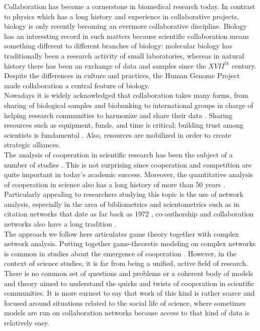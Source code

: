 \documentclass{bmcart}
\begin{document}
Collaboration has become a cornerstone in biomedical research today.
In contrast to physics which has a long history and experience in
collaborative projects, biology is only recently becoming an evermore
collaborative discipline\cite{VermeulenPenders:2013}. Biology has an
interesting record in such matters because scientific collaboration
means something different to different branches of biology: molecular
biology has traditionally been a research activity of small
laboratories\cite{KnorrCetina:1999,Strasser:2006}, whereas in natural
history there has been an exchange of data and samples since the $XVII^{th}$
century\cite{MullerWille-etal:2012,Strasser:2012}. Despite the differences in
culture and practices, the Human Genome Project made collaboration a
central feature of biology.\\


Nowadays it is widely acknowledged that collaboration takes many forms, from
sharing of biological samples and biobanking to international groups in charge
of helping research communities to harmonize and share their data {\color{red}
\cite{VermeulenPenders:2013,Barrett-etal:2013,Federer-etal:2015,Karimi-Busheri:2015,Vallance-etal:2016,Warner-etal:2017}. Sharing
resources such as equipment, funds, and time is critical; building trust among
scientists is fundamental \cite{Bennett-etal:2010,Leite:2017}. Also, resources are mobilized
in order to create strategic alliances.}\\ 


{\color{red}The analysis of cooperation in scientific research has been the
subject of a number of studies
\cite{VermeulenPenders:2013,Newman:2001,Newman:2004,Elango-etal:2012,HernandezLemus:2013,Strasser:2006,Strasser:2012}. This
is not surprising since cooperation and competition are quite
important in today's academic success. Moreover, the quantitative
analysis of cooperation in science also has a long history of more
than 50 years
\cite{Mali-etal:2012,Scharnhorst-etal:2012}. Particularly appealing to
researchers studying this topic is the use of network analysis,
especially in the area of bibliometrics and scientometrics such as in
citation networks that date as far back as 1972 \cite{Garfield:1972},
co-authorship and collaboration networks also have a long tradition
\cite{Todorov-etal:1991,Wagner-etal:2017}.}\\

{\color{red}The approach we follow here articulates game theory together with
complex network analysis. Putting together game-theoretic modeling on
complex networks is common in studies about the emergence of
cooperation
\cite{SzaboFath:2007,Nowak-etal:92,OshtukiNowak:2006,Santos-etal:2005,Santos-etal:2006}.
However, in the context of science studies, it is far from being a
unified, active field of research. There is no common set of questions
and problems or a coherent body of models and theory aimed to
understand the quirks and twists of cooperation in scientific
communities. It is more earnest to say that work of this kind is
rather scarce and focused around situations related to
the social life of science, where sometimes models are run on
collaboration networks because access to that kind of data is
relatively easy.}\\
\end{document}
